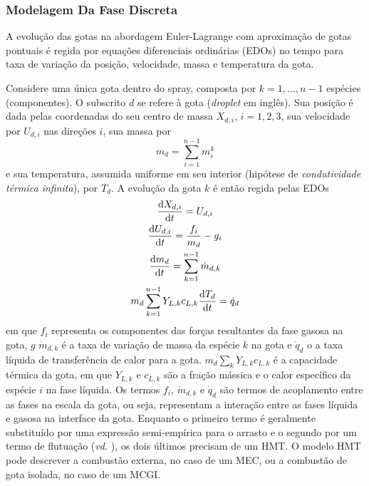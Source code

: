     

\subsubsection{Modelagem Da Fase Discreta} \label{sec:gotas}

A evolução das gotas na abordagem Euler-Lagrange com aproximação de gotas pontuais é regida por equações diferenciais ordinárias (EDOs) no tempo para taxa de variação da posição, velocidade, massa e temperatura da gota.

Considere uma única gota dentro do spray, composta por $k=1,\ldots,n-1$ espécies (componentes).
O subscrito $d$ se refere à gota (\emph{droplet} em inglês).
Sua posição é dada pelas coordenadas do seu centro de massa $X_{d,i}$, $i=1,2,3$, sua velocidade por $U_{d,i}$ nas direções $i$, sua massa por 
\begin{equation}    
    m_d = \sum_{i=1}^{n-1} m_{i}^k
\end{equation}
e sua temperatura, assumida uniforme em seu interior (hipótese de \emph{condutividade térmica infinita}), por $T_d$.
A evolução da gota $k$ é então regida pelas EDOs \cite{JennyB2012}
\begin{gather}
    \frac{\mathrm{d} X_{d,i}}{\mathrm{d} t} = U_{d,i}
    \label{eq:Ud}\\
    \frac{\mathrm{d} U_{d,i}}{\mathrm{d} t} =
    \frac{f_i}{ m_{d}} -
    g_i 
    \label{eq:Xd} \\
    \frac{\mathrm{d} m_{d}}{\mathrm{d} t} = \sum_{k=1}^{n-1} \dot m_{d,k}
    \label{eq:md} \\
    m_d \sum_{k=1}^{n-1} Y_{L,k} c_{L,k} \frac{\mathrm{d} T_d}{\mathrm{d} t} = \dot q_d
    \label{eq:Td}
\end{gather}
em que $f_i$ representa os componentes das forças resultantes da fase gasosa na gota, $g$
$\dot m_{d,k}$ é a taxa de variação de massa da espécie $k$ na gota e $\dot q_d$ o a taxa líquida de transferência de calor para a gota.
$ m_d \sum_k Y_{L,k} c_{L,k}$ é a capacidade térmica da gota, em que 
$Y_{L,k}$ e $c_{L,k}$ são a fração mássica e o calor específico da  espécie $i$ na fase líquida.
Os termos $f_i$, $\dot m_{d,k}$ e $\dot q_d$ são termos de acoplamento entre as fases na escala da gota, ou seja, representam a interação entre as fases líquida e gasosa na interface da gota.
Enquanto o primeiro termo é geralmente substituído por uma expressão semi-empírica para o arrasto e o segundo por um termo de flutuação (\emph{vd.} \cite[p. 16]{JennyB2012}), os dois últimos precisam de um HMT.
O modelo HMT pode descrever a combustão externa, no caso de um MEC, ou a combustão de gota isolada, no caso de um MCGI.  

